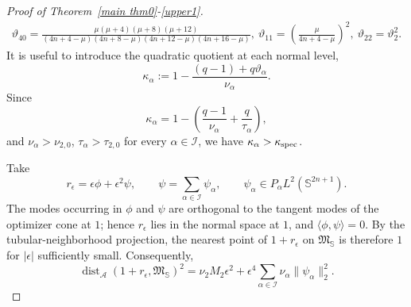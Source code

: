 \documentclass[11pt]{article}
\begin{document}
\begin{proof}[Proof of Theorem~\ref{main thm0}-\eqref{upper1}]
\begin{equation*}
\begin{aligned}
 \vartheta_{40}=\frac{\mu(\mu+4)(\mu+8)(\mu+12)}{(4n+4-\mu)(4n+8-\mu)(4n+12-\mu)(4n+16-\mu)},\
 \vartheta_{11}=\left(\frac\mu{4n+4-\mu}\right)^2,\
 \vartheta_{22}=\vartheta_2^2.
\end{aligned}
\end{equation*}
It is useful to introduce the quadratic quotient at each normal level,
\begin{equation*}
 \kappa_\alpha:=1-\frac{(q-1)+q\vartheta_\alpha}{\nu_\alpha}.
\end{equation*}
{Since
\[
\kappa_\alpha=1-\left(\frac{q-1}{\nu_\alpha}+\frac{q}{\tau_\alpha}\right),
\]
and} \(\nu_\alpha>\nu_{2,0}\), \(\tau_\alpha>\tau_{2,0}\) for every \(\alpha\in\mathcal I\), we have $\kappa_\alpha>\kappa_{\rm spec}$.


Take
\begin{equation*}
 r_\epsilon=\epsilon\phi+\epsilon^2\psi,\qquad
 \psi=\sum_{\alpha\in\mathcal I}\psi_\alpha,\qquad
 \psi_\alpha\in P_\alpha L^2(\mathbb S^{2n+1}).
\end{equation*}
{The modes occurring in $\phi$ and $\psi$ are orthogonal to the tangent modes of the optimizer cone at $1$; hence $r_\epsilon$ lies in the normal space at $1$, and $\langle\phi,\psi\rangle=0$. By the tubular-neighborhood projection, the nearest point of $1+r_\epsilon$ on $\mathfrak M_{\mathbb S}$ is therefore $1$ for $|\epsilon|$ sufficiently small. Consequently,}
\begin{equation}\label{exact-distance-fourth}
 \operatorname{dist}_{\mathscr A}(1+r_\epsilon,\mathfrak M_{\mathbb S})^2
 =\nu_2M_2\epsilon^2+\epsilon^4\sum_{\alpha\in\mathcal I}\nu_\alpha\|\psi_\alpha\|_2^2.
\end{equation}


\end{proof}
\end{document}
